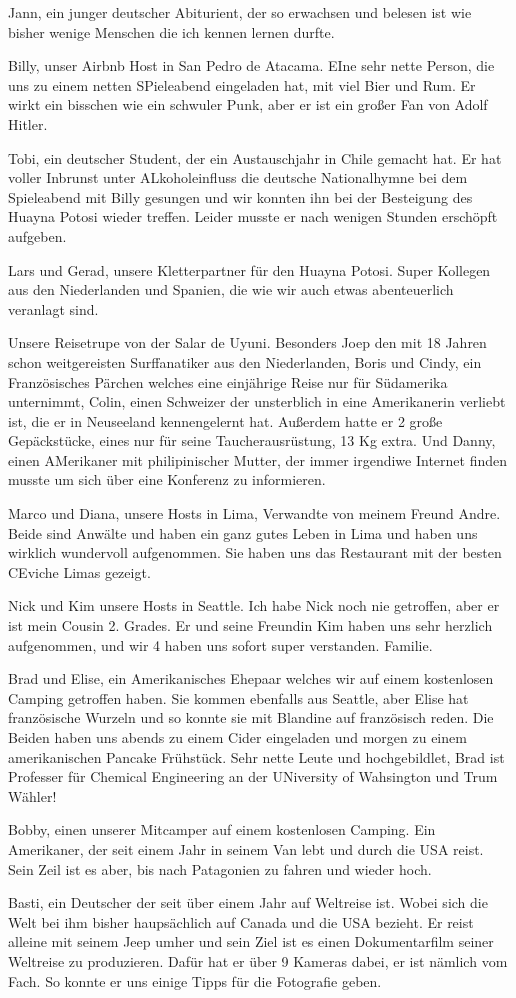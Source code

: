 \documentclass[11pt]{book}
\begin{document}
Jann, ein junger deutscher Abiturient, der so erwachsen und belesen ist wie bisher wenige Menschen die ich kennen lernen durfte.

Billy, unser Airbnb Host in San Pedro de Atacama. EIne sehr nette Person, die uns zu einem netten SPieleabend eingeladen hat, mit viel Bier und Rum. 
Er wirkt ein bisschen wie ein schwuler Punk, aber er ist ein großer Fan von Adolf Hitler. 

Tobi, ein deutscher Student, der ein Austauschjahr in Chile gemacht hat. Er hat voller Inbrunst unter ALkoholeinfluss die deutsche Nationalhymne bei dem 
Spieleabend mit Billy gesungen und wir konnten ihn bei der Besteigung des Huayna Potosi wieder treffen. Leider musste er nach wenigen Stunden erschöpft aufgeben. 

Lars und Gerad, unsere Kletterpartner für den Huayna Potosi. Super Kollegen aus den Niederlanden und Spanien, die wie wir auch etwas abenteuerlich veranlagt sind.

Unsere Reisetrupe von der Salar de Uyuni. Besonders Joep den mit 18 Jahren schon weitgereisten Surffanatiker aus den Niederlanden, Boris und Cindy, ein Französisches 
Pärchen welches eine einjährige Reise nur für Südamerika unternimmt, Colin, einen Schweizer der unsterblich in eine Amerikanerin verliebt ist, die er in 
Neuseeland kennengelernt hat. Außerdem hatte er 2 große Gepäckstücke, eines nur für seine Taucherausrüstung, 13 Kg extra. Und Danny, einen AMerikaner mit philipinischer 
Mutter, der immer irgendiwe Internet finden musste um sich über eine Konferenz zu informieren. 

Marco und Diana, unsere Hosts in Lima, Verwandte von meinem Freund Andre. Beide sind Anwälte und haben ein ganz gutes Leben in Lima und haben uns wirklich wundervoll 
aufgenommen. Sie haben uns das Restaurant mit der besten CEviche Limas gezeigt. 


Nick und Kim unsere Hosts in Seattle. Ich habe Nick noch nie getroffen, aber er ist mein Cousin 2. Grades. Er und seine Freundin Kim haben uns sehr herzlich aufgenommen, 
und wir 4 haben uns sofort super verstanden. Familie. 


Brad und Elise, ein Amerikanisches Ehepaar welches wir auf einem kostenlosen Camping getroffen haben. Sie kommen ebenfalls aus Seattle, aber Elise hat 
französische Wurzeln und so konnte sie mit Blandine auf französisch reden. Die Beiden haben uns abends zu einem Cider eingeladen und morgen zu einem amerikanischen 
Pancake Frühstück. Sehr nette Leute und hochgebildlet, Brad ist Professer für Chemical Engineering an der UNiversity of Wahsington und Trum Wähler!


Bobby, einen unserer Mitcamper auf einem kostenlosen Camping. Ein Amerikaner, der seit einem Jahr in seinem Van lebt und durch die USA reist. Sein Zeil 
ist es aber, bis nach Patagonien zu fahren und wieder hoch.


Basti, ein Deutscher der seit über einem Jahr auf Weltreise ist. Wobei sich die Welt bei ihm bisher  haupsächlich auf Canada und die USA bezieht. Er reist alleine 
mit seinem Jeep umher und sein Ziel ist es einen Dokumentarfilm seiner Weltreise zu produzieren. Dafür hat er über 9 Kameras dabei, er ist nämlich vom Fach. 
So konnte er uns einige Tipps für die Fotografie geben. 
\end{document}
